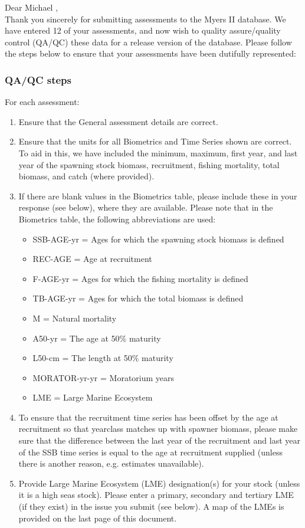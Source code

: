 \documentclass [a4paper, 10pt] {article}
\begin{document}
\noindent Dear Michael ,\\

\noindent Thank you sincerely for submitting assessments to the Myers II database. We have entered 12 of your assessments, and now wish to quality assure/quality control (QA/QC) these data for a release version of the database. Please follow the steps below to ensure that your assessments have been dutifully represented:
\subsubsection{QA/QC steps}
For each assessment:
\begin{enumerate}
\item Ensure that the General assessment details are correct.
\item Ensure that the units for all Biometrics and Time Series shown are correct. To aid in this, we have included the minimum, maximum, first year, and last year of the spawning stock biomass, recruitment, fishing mortality, total biomass, and  catch  (where provided). 
\item If there are blank values in the Biometrics table, please include these in your response (see below), where they are available.
Please note that in the Biometrics table, the following abbreviations are used:
\begin{itemize}
\item SSB-AGE-yr  = Ages for which the spawning stock biomass is defined
\item REC-AGE     = Age at recruitment
\item F-AGE-yr    = Ages for which the fishing mortality is defined 
\item TB-AGE-yr   = Ages for which the total biomass is defined
\item M      = Natural mortality
\item A50-yr      = The age at 50\% maturity
\item L50-cm      = The length at 50\% maturity
\item MORATOR-yr-yr = Moratorium years
\item LME = Large Marine Ecosystem\\
\end{itemize}
\item To ensure that the recruitment time series has been offset by the age at recruitment so that yearclass matches up with spawner biomass, please make sure that the difference between the last year of the recruitment and last year of the SSB time series is equal to the age at recruitment supplied (unless there is another reason, e.g. estimates unavailable). 
\item Provide Large Marine Ecosystem (LME) designation(s) for your stock (unless it is a high seas stock). Please enter a primary, secondary and tertiary LME (if they exist) in the issue you submit (see below). A map of the LMEs is provided on the last page of this document. 
\end{enumerate}
\vspace{-.25in}
\end{document}
